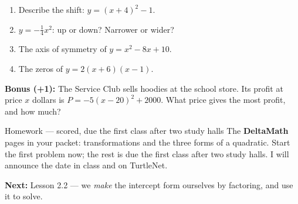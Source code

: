 \documentclass[aspectratio=169, 11pt]{beamer}
\begin{document}
\begin{frame}[t, plain]
  \begin{enumerate}\setlength{\itemsep}{3pt}
    \item Describe the shift: $y=(x+4)^2-1$.
    \item $y=-\tfrac14x^2$: up or down? Narrower or wider?
    \item The axis of symmetry of $y=x^2-8x+10$.
    \item The zeros of $y=2(x+6)(x-1)$.
  \end{enumerate}
  {\small\textbf{Bonus (+1):} The Service Club sells hoodies at the school store. Its profit at
  price $x$ dollars is $P=-5(x-20)^2+2000$. What price gives the most profit, and how much?}
\end{frame}

\begin{frame}[t, plain]
  \begin{block}{Homework --- scored, due the first class after two study halls}
    The \textbf{DeltaMath} pages in your packet: transformations and the three forms of a
    quadratic. Start the first problem now; the rest is due the first class after two study
    halls. I will announce the date in class and on TurtleNet.
  \end{block}
  \vspace{6pt}
  \textbf{Next:} Lesson 2.2 --- we \emph{make} the intercept form ourselves by factoring, and
  use it to solve.
\end{frame}
\end{document}
